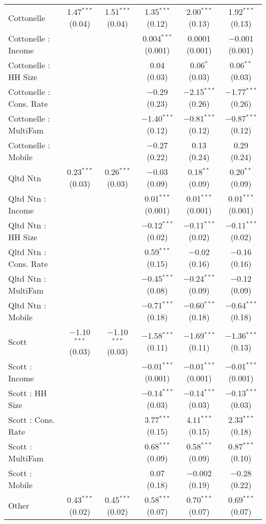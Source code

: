 \begin{table}[!htbp]
\begin{tabular}{@{\extracolsep{5pt}}lccccc}
  Cottonelle & 1.47$^{***}$ (0.04) & 1.51$^{***}$ (0.04) & 1.35$^{***}$ (0.12) & 2.00$^{***}$ (0.13) & 1.92$^{***}$ (0.13) \\ 
  Cottonelle : Income &  &  & 0.004$^{***}$ (0.001) & 0.0001 (0.001) & $-$0.001 (0.001) \\ 
  Cottonelle : HH Size &  &  & 0.04 (0.03) & 0.06$^{*}$ (0.03) & 0.06$^{**}$ (0.03) \\ 
  Cottonelle : Cons. Rate &  &  & $-$0.29 (0.23) & $-$2.15$^{***}$ (0.26) & $-$1.77$^{***}$ (0.26) \\ 
  Cottonelle : MultiFam &  &  & $-$1.40$^{***}$ (0.12) & $-$0.81$^{***}$ (0.12) & $-$0.87$^{***}$ (0.12) \\ 
  Cottonelle : Mobile &  &  & $-$0.27 (0.22) & 0.13 (0.24) & 0.29 (0.24) \\ 
  Qltd Ntn & 0.23$^{***}$ (0.03) & 0.26$^{***}$ (0.03) & $-$0.03 (0.09) & 0.18$^{**}$ (0.09) & 0.20$^{**}$ (0.09) \\ 
  Qltd Ntn : Income &  &  & 0.01$^{***}$ (0.001) & 0.01$^{***}$ (0.001) & 0.01$^{***}$ (0.001) \\ 
  Qltd Ntn : HH Size &  &  & $-$0.12$^{***}$ (0.02) & $-$0.11$^{***}$ (0.02) & $-$0.11$^{***}$ (0.02) \\ 
  Qltd Ntn : Cons. Rate &  &  & 0.59$^{***}$ (0.15) & $-$0.02 (0.16) & $-$0.16 (0.16) \\ 
  Qltd Ntn : MultiFam &  &  & $-$0.45$^{***}$ (0.08) & $-$0.24$^{***}$ (0.09) & $-$0.12 (0.09) \\ 
  Qltd Ntn : Mobile &  &  & $-$0.71$^{***}$ (0.18) & $-$0.60$^{***}$ (0.18) & $-$0.64$^{***}$ (0.18) \\ 
  Scott & $-$1.10$^{***}$ (0.03) & $-$1.10$^{***}$ (0.03) & $-$1.58$^{***}$ (0.11) & $-$1.69$^{***}$ (0.11) & $-$1.36$^{***}$ (0.13) \\ 
  Scott : Income &  &  & $-$0.01$^{***}$ (0.001) & $-$0.01$^{***}$ (0.001) & $-$0.01$^{***}$ (0.001) \\ 
  Scott : HH Size &  &  & $-$0.14$^{***}$ (0.03) & $-$0.14$^{***}$ (0.03) & $-$0.13$^{***}$ (0.03) \\ 
  Scott : Cons. Rate &  &  & 3.77$^{***}$ (0.15) & 4.11$^{***}$ (0.15) & 2.33$^{***}$ (0.18) \\ 
  Scott : MultiFam &  &  & 0.68$^{***}$ (0.09) & 0.58$^{***}$ (0.09) & 0.87$^{***}$ (0.10) \\ 
  Scott : Mobile &  &  & 0.07 (0.18) & $-$0.002 (0.19) & $-$0.28 (0.22) \\ 
  Other & 0.43$^{***}$ (0.02) & 0.45$^{***}$ (0.02) & 0.58$^{***}$ (0.07) & 0.70$^{***}$ (0.07) & 0.69$^{***}$ (0.07) \\ 

\end{tabular}
\end{table}
